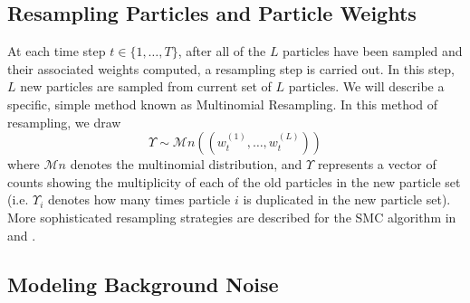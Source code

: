 \documentclass[smallcondensed, final]{svjour3}
\begin{document}





\subsection{Resampling Particles and Particle Weights}
\label{sec:resample}

At each time step $t \in \{ 1, \ldots, T \}$, after all of the $L$ particles have been sampled and their associated weights computed, a resampling step is carried out. In this step, $L$ new particles are sampled from current set of $L$ particles. We will describe a specific, simple method known as Multinomial Resampling. In this method of resampling, we draw
\begin{equation}
\Upsilon \sim \mathcal{M}n((w_{t}^{(1)}, \ldots, w_{t}^{(L)}))
\end{equation}
where $\mathcal{M}n$ denotes the multinomial distribution, and $\Upsilon$ represents a vector of counts showing the multiplicity of each of the old particles in the new particle set (i.e. $\Upsilon_{i}$ denotes how many times particle $i$ is duplicated in the new particle set). More sophisticated resampling strategies are described for the SMC algorithm in \cite{gasthaus_thesis} and \cite{douc2005comparison}.





\subsection{Modeling Background Noise}
\end{document}
